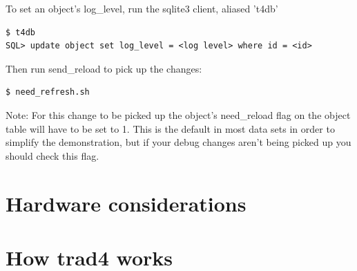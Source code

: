 \documentclass{report}
\begin{document}
To set an object's log_level, run the sqlite3 client, aliased 't4db'

\begin{verbatim}
$ t4db
SQL> update object set log_level = <log level> where id = <id>
\end{verbatim}

Then run send_reload to pick up the changes:

\begin{verbatim}
$ need_refresh.sh
\end{verbatim}

Note: For this change to be picked up the object's need_reload flag on the object table will have to be set to 1. This is the default in most data sets in order to simplify the demonstration, but if your debug changes aren't being picked up you should check this flag.

\chapter{Hardware considerations}

\appendix

\chapter{How trad4 works}
\end{document}
